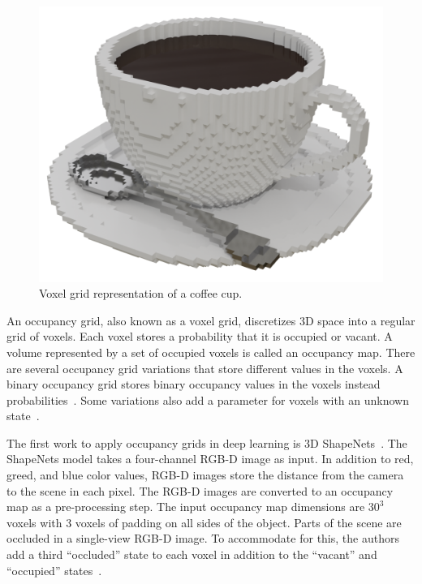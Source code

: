 \begin{figure}[ht]
	\centering
	\includegraphics[scale=0.2]{Images/Voxel Cup}
	\caption{Voxel grid representation of a coffee cup.}
	\label{fig:voxel_cup}
\end{figure}

An occupancy grid, also known as a voxel grid, discretizes 3D space into a regular grid of voxels. Each voxel stores a probability that it is occupied or vacant. A volume represented by a set of occupied voxels is called an occupancy map. There are several occupancy grid variations that store different values in the voxels. A binary occupancy grid stores binary occupancy values in the voxels instead probabilities~\cite{Konolige1997}. Some variations also add a parameter for voxels with an unknown state~\cite{Ahmed2018}.

The first work to apply occupancy grids in deep learning is 3D ShapeNets~\cite{Wu2015}. The ShapeNets model takes a four-channel RGB-D image as input. In addition to red, greed, and blue color values, RGB-D images store the distance from the camera to the scene in each pixel. The RGB-D images are converted to an occupancy map as a pre-processing step. The input occupancy map dimensions are $30^3$ voxels with 3 voxels of padding on all sides of the object. Parts of the scene are occluded in a single-view RGB-D image. To accommodate for this, the authors add a third ``occluded'' state to each voxel in addition to the ``vacant'' and ``occupied'' states~\cite{Wu2015}.

